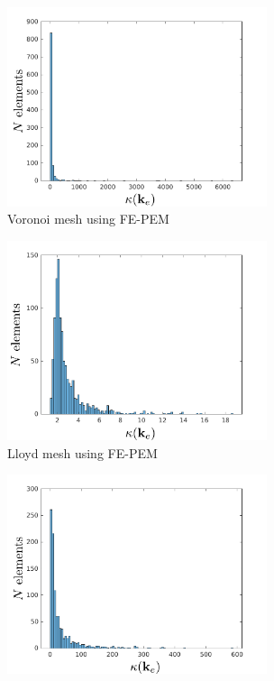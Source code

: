 \begin{figure}[!h]
    \centering
    \begin{subfigure}[b]{0.49\linewidth}
            \centering
            \includegraphics[width=3.0in]{figures/patch_condition_number_FEPEM.pdf}
    			\caption{Voronoi mesh using FE-PEM \label{fig:patch_condition_number_FEPEM}}
    \end{subfigure}
	\begin{subfigure}[b]{0.49\linewidth}
            \centering
            \includegraphics[width=3.0in]{figures/lloyd_condition_number_FEPEM.pdf}
    			\caption{Lloyd mesh using FE-PEM \label{fig:lloyd_condition_number_FEPEM}}
    \end{subfigure}
    \begin{subfigure}[b]{0.49\linewidth}
            \centering
            \includegraphics[width=3.0in]{figures/patch_condition_number_DGPEM.pdf}

\end{subfigure}
\end{figure}
